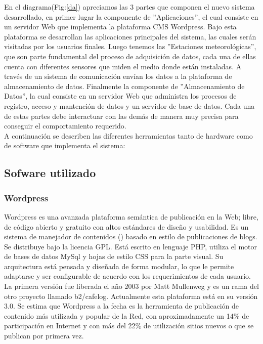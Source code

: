 En el diagrama(Fig:\ref{da}) apreciamos las 3 partes que componen el nuevo sistema desarrollado, en primer lugar la componente de ''Aplicaciones'', el cual consiste en un servidor Web que implementa la plataforma CMS Wordpress. Bajo esta plataforma se desarrollan las aplicaciones principales del sistema, las cuales serán visitadas por los usuarios finales. Luego tenemos las ''Estaciones meteorológicas'', que son parte fundamental del proceso de adquisición de datos, cada una de ellas cuenta con diferentes sensores que miden el medio donde están instaladas. A través de un sistema de comunicación envían los datos a la plataforma de almacenamiento de datos. Finalmente la componente de ''Almacenamiento de Datos'', la cual consiste en un servidor Web que administra los procesos de registro, acceso y mantención de datos y un servidor de base de datos. Cada una de estas partes debe interactuar con las demás de manera muy precisa para conseguir el comportamiento requerido.\\

A continuación se describen las diferentes herramientas tanto de hardware como de software que implementa el sistema:

\subsection{Sofware utilizado}
\subsubsection{Wordpress}
Wordpress es una avanzada plataforma semántica de publicación en la Web; libre, de código abierto y gratuito con altos estándares de diseño y usabilidad. Es un sistema de manejador de contenidos () basado en estilo de publicaciones de blogs. Se distribuye bajo la licencia GPL. Está escrito en lenguaje PHP, utiliza el motor de bases de datos MySql y hojas de estilo CSS para la parte visual. Su arquitectura está pensada y diseñada de forma modular, lo que le permite adaptarse y ser configurable de acuerdo con los requerimientos de cada usuario.\\
La primera versión fue liberada el año 2003 por Matt Mullenweg y es un rama del otro proyecto llamado b2/cafelog. Actualmente esta plataforma está en su versión 3.0. Se estima que Wordpress a la fecha es la herramienta de publicación de contenido más utilizada y popular de la Red, con aproximadamente un 14\% de participación en Internet y con más del 22\% de utilización sitios nuevos o que se publican por primera vez\cite{software:usoWordpress}.

